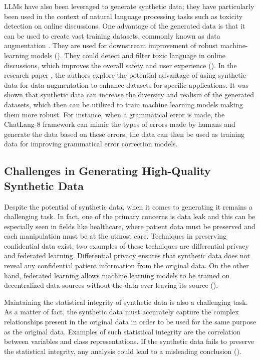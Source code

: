 \vspace{0.5cm}
LLMs have also been leveraged to generate synthetic data; they have particularly been used in the context of natural language processing tasks such as toxicity detection on online discussions. One advantage of the generated data is that it can be used to create vast training datasets, commonly known as data augmentation \cite{Kruschwitz2024}. They are used for downstream improvement of robust machine-learning models (\cite{Radford2018}). They could detect and filter toxic language in online discussions, which improves the overall safety and user experience (\cite{Kruschwitz2024}). In the research paper \cite{Park2024}, the authors explore the potential advantage of using synthetic data for data augmentation to enhance datasets for specific applications. It was shown that synthetic data can increase the diversity and realism of the generated datasets, which then can be utilized to train machine learning models making them more robust. For instance, when a grammatical error is made, the ChatLang-8 framework can mimic the types of errors made by humans and generate the data based on these errors, the data can then be used as training data for improving grammatical error correction models.




\subsection{Challenges in Generating High-Quality Synthetic Data}

Despite the potential of synthetic data, when it comes to generating it remains a challenging task. In fact, one of the primary concerns is data leak and this can be especially seen in fields like healthcare, where patient data must be preserved and each manipulation must be at the utmost care. Techniques in preserving confidential data exist, two examples of these techniques are differential privacy and federated learning. Differential privacy ensures that synthetic data does not reveal any confidential patient information from the original data. On the other hand, federated learning allows machine learning models to be trained on decentralized data sources without the data ever leaving its source (\cite{Dwork2008}).

\vspace{0.5cm}
Maintaining the statistical integrity of synthetic data is also a challenging task. As a matter of fact, the synthetic data must accurately capture the complex relationships present in the original data in order to be used for the same purpose as the original data. Examples of such statistical integrity are the correlation between variables and class representations. If the synthetic data fails to preserve the statistical integrity, any analysis could lead to a misleading conclusion (\cite{Snoke2018}).

